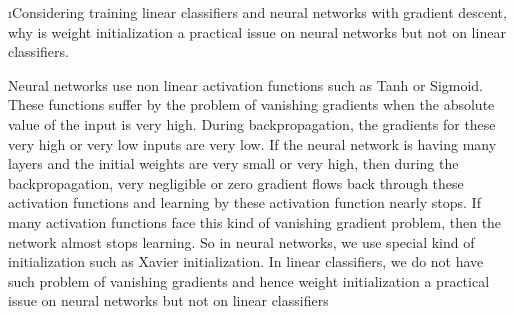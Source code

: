 \documentclass[fleqn]{article}
\begin{document}
\vspace{1.5in}

\i Considering training linear classifiers and neural networks with gradient descent, why is weight initialization a practical issue on neural networks but not on linear classifiers.

\begin{solution}
Neural networks use non linear activation functions such as Tanh or Sigmoid. These functions suffer by the problem of vanishing gradients when the absolute value of the input is very high. During backpropagation, the gradients for these very high or very low inputs are very low. If the neural network is having many layers and the initial weights are very small or very high, then during the backpropagation, very negligible or zero gradient flows back through these activation functions and learning by these activation function nearly stops. If many activation functions face this kind of vanishing gradient problem, then the network almost stops learning.
So in neural networks, we use special kind of initialization such as Xavier initialization.	   \newline
In linear classifiers, we do not have such problem of vanishing gradients and hence weight initialization a practical issue on neural networks but not on linear classifiers


 

\end{solution}

\vspace{1.5in}


\ene
\end{document}
